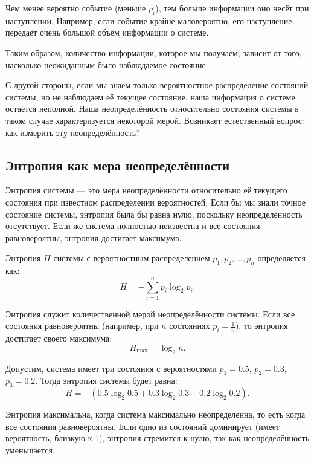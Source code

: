 \documentclass[12pt,a4paper]{article}
\newenvironment{defbox}[1][]{%
  \begin{tcolorbox}[enhanced, breakable, colback=defcolor, colframe=green!50!black, title=#1, fonttitle=\bfseries, arc=3pt, boxrule=0.5pt]
}{\end{tcolorbox}}
\newenvironment{exbox}[1][]{%
  \begin{tcolorbox}[enhanced, breakable, colback=excolor, colframe=brown!50!black, title=#1, fonttitle=\bfseries, arc=3pt, boxrule=0.5pt]
}{\end{tcolorbox}}
\newenvironment{rembox}[1][]{%
  \begin{tcolorbox}[enhanced, breakable, colback=gray!5, colframe=gray!50, title=#1, fonttitle=\bfseries, arc=3pt, boxrule=0.5pt]
}{\end{tcolorbox}}
\begin{document}
\begin{rembox}[Интерпретация количества информации]
Чем менее вероятно событие (меньше $p_i$), тем больше информации оно несёт при наступлении. Например, если событие крайне маловероятно, его наступление передаёт очень большой объём информации о системе.
\end{rembox}

Таким образом, количество информации, которое мы получаем, зависит от того, насколько неожиданным было наблюдаемое состояние.

С другой стороны, если мы знаем только вероятностное распределение состояний системы, но не наблюдаем её текущее состояние, наша информация о системе остаётся неполной. Наша неопределённость относительно состояния системы в таком случае характеризуется некоторой мерой. Возникает естественный вопрос: как измерить эту неопределённость?

\subsection{Энтропия как мера неопределённости}

Энтропия системы — это мера неопределённости относительно её текущего состояния при известном распределении вероятностей. Если бы мы знали точное состояние системы, энтропия была бы равна нулю, поскольку неопределённость отсутствует. Если же система полностью неизвестна и все состояния равновероятны, энтропия достигает максимума.

\begin{defbox}[Энтропия системы]
Энтропия $H$ системы с вероятностным распределением $p_1, p_2, \dots, p_n$ определяется как:
\[
H = - \sum_{i=1}^n p_i \log_2 p_i.
\]
\end{defbox}

Энтропия служит количественной мерой неопределённости системы. Если все состояния равновероятны (например, при $n$ состояниях $p_i = \frac{1}{n}$), то энтропия достигает своего максимума:
\[
H_{\text{max}} = \log_2 n.
\]

\begin{exbox}[Пример]
Допустим, система имеет три состояния с вероятностями $p_1 = 0.5$, $p_2 = 0.3$, $p_3 = 0.2$. Тогда энтропия системы будет равна:
\[
H = - \left( 0.5 \log_2 0.5 + 0.3 \log_2 0.3 + 0.2 \log_2 0.2 \right).
\]
\end{exbox}

\begin{rembox}[Интуитивное понимание энтропии]
Энтропия максимальна, когда система максимально неопределённа, то есть когда все состояния равновероятны. Если одно из состояний доминирует (имеет вероятность, близкую к 1), энтропия стремится к нулю, так как неопределённость уменьшается.
\end{rembox}
\end{document}
